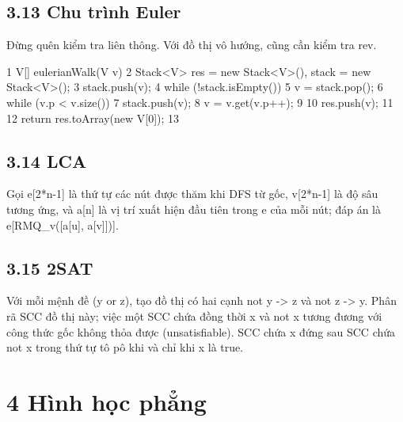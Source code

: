 \documentclass[11pt]{article}
\begin{document}
\subsection{3.13 Chu trình Euler}
\begin{NoteBlock}
Đừng quên kiểm tra liên thông.
Với đồ thị vô hướng, cũng cần kiểm tra rev.
\end{NoteBlock}
\begin{Code}
1 V[] eulerianWalk(V v) {
2 Stack<V> res = new Stack<V>(), stack = new Stack<V>();
3 stack.push(v);
4 while (!stack.isEmpty()) {
5 v = stack.pop();
6 while (v.p < v.size()) {
7 stack.push(v);
8 v = v.get(v.p++);
9 }
10 res.push(v);
11 }
12 return res.toArray(new V[0]);
13 }
\end{Code}
\subsection{3.14 LCA}
\begin{NoteBlock}
Gọi e[2*n-1] là thứ tự các nút được thăm khi DFS từ gốc, v[2*n-1] là độ sâu tương ứng, và
a[n] là vị trí xuất hiện đầu tiên trong e của mỗi nút; đáp án là e[RMQ_v([a[u], a[v]])].
\end{NoteBlock}
\subsection{3.15 2SAT}
\begin{NoteBlock}
Với mỗi mệnh đề (y or z), tạo đồ thị có hai cạnh not y -> z và not z -> y.
Phân rã SCC đồ thị này; việc một SCC chứa đồng thời x và not x tương đương với công thức gốc không thỏa được
(unsatisfiable).
SCC chứa x đứng sau SCC chứa not x trong thứ tự tô pô khi và chỉ khi x là true.
\end{NoteBlock}
\section{4 Hình học phẳng}
\end{document}
